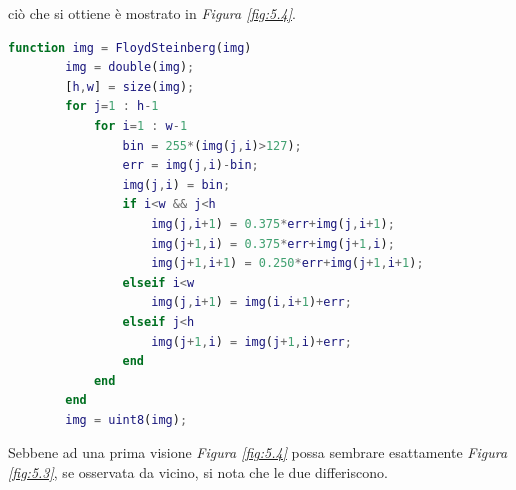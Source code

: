 \documentclass{subfiles}
\begin{document}
ciò che si ottiene è mostrato in \emph{Figura \ref{fig:5.4}}.
\begin{center}
    \begin{lstlisting}[language = MATLAB]
        function img = FloydSteinberg(img)
        img = double(img);
        [h,w] = size(img);
        for j=1 : h-1
            for i=1 : w-1
                bin = 255*(img(j,i)>127);
                err = img(j,i)-bin;
                img(j,i) = bin;
                if i<w && j<h
                    img(j,i+1) = 0.375*err+img(j,i+1);
                    img(j+1,i) = 0.375*err+img(j+1,i);
                    img(j+1,i+1) = 0.250*err+img(j+1,i+1);
                elseif i<w
                    img(j,i+1) = img(i,i+1)+err;
                elseif j<h
                    img(j+1,i) = img(j+1,i)+err;
                end
            end
        end
        img = uint8(img);
    \end{lstlisting}
\end{center}
\clearpage

Sebbene ad una prima visione \emph{Figura \ref{fig:5.4}} possa sembrare esattamente \emph{Figura \ref{fig:5.3}}, se osservata da vicino, si nota che le due differiscono.
\end{document}
